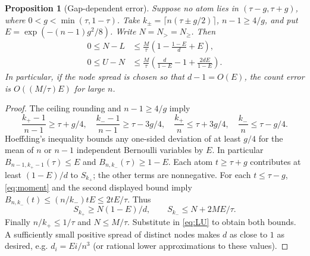 \documentclass[11pt]{article}
\newtheorem{proposition}[theorem]{Proposition}
\theoremstyle{remark}\newtheorem{remark}[theorem]{Remark}
\begin{document}
\begin{proposition}[Gap-dependent error]\label{prop:rate}
Suppose no atom lies in $(\tau-g,\tau+g)$, where $0<g<\min(\tau,1-\tau)$. Take $k_\pm=\lceil n(\tau\pm g/2)\rceil$, $n-1\ge4/g$, and put $E=\exp(-(n-1)g^2/8)$. Write $N=N_>=N_\ge$. Then
\begin{align*}
 0\le N-L&\le\frac M\tau\left(1-\frac{1-E}{d}+E\right),\\
 0\le U-N&\le\frac M\tau\left(\frac{d}{1-E}-1+\frac{2dE}{1-E}\right).
\end{align*}
In particular, if the node spread is chosen so that $d-1=O(E)$, the count error is $O((M/\tau)E)$ for large $n$.
\end{proposition}
\begin{proof}
The ceiling rounding and $n-1\ge4/g$ imply
\[
 \frac{k_+-1}{n-1}\ge\tau+g/4,\quad
 \frac{k_--1}{n-1}\ge\tau-3g/4,
 \quad \frac{k_+}{n}\le\tau+3g/4,\quad
 \frac{k_-}{n}\le\tau-g/4.
\]
Hoeffding's inequality \cite{hoeffding} bounds any one-sided deviation of at least $g/4$ for the mean of $n$ or $n-1$ independent Bernoulli variables by $E$. In particular $B_{n-1,k_+-1}(\tau)\le E$ and $B_{n,k_-}(\tau)\ge1-E$. Each atom $t\ge\tau+g$ contributes at least $(1-E)/d$ to $S_{k_+}$; the other terms are nonnegative. For each $t\le\tau-g$, \eqref{eq:moment} and the second displayed bound imply $B_{n,k_-}(t)\le(n/k_-)t E\le2t E/\tau$. Thus
\[
 S_{k_+}\ge N(1-E)/d,\qquad S_{k_-}\le N+2ME/\tau.
\]
Finally $n/k_+\le1/\tau$ and $N\le M/\tau$. Substitute in \eqref{eq:LU} to obtain both bounds. A sufficiently small positive spread of distinct nodes makes $d$ as close to $1$ as desired, e.g. $d_i=E i/n^3$ (or rational lower approximations to these values).
\end{proof}
\end{document}
